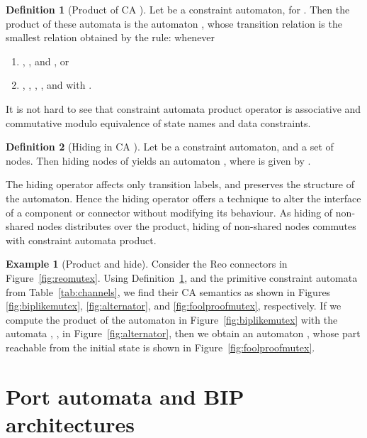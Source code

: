 \documentclass[submission,copyright,creativecommons,hidelinks]{eptcs}
\theoremstyle{plain} \newtheorem{theorem}{Theorem}
\theoremstyle{definition}
\newtheorem{definition}{Definition}
\newtheorem{example}{Example}
\theoremstyle{remark}
\newcommand\xqed[1]{\leavevmode\unskip\penalty9999 \hbox{}\nobreak\hfill
  \quad\hbox{#1}}
\newcommand\tri{\xqed{}}
\newcommand{\defn}[1]{Definition~\ref{defn:#1}}
\newcommand{\fig}[2][]{Figure~\ref{fig:#2}\ensuremath{#1}}
\newcommand{\tab}[1]{Table~\ref{tab:#1}}
\begin{document}
\begin{definition}[Product of CA \cite{BSAR06}]
\label{defn:ProductCA} 
Let  be a constraint automaton, for . Then the product  of these automata is the automaton , whose transition relation is the smallest relation obtained by the rule:  whenever
\begin{enumerate}
	\item , , and , or
	\item , , , , and  with .
\end{enumerate}
\end{definition}

It is not hard to see that constraint automata product operator is associative and commutative modulo equivalence of state names and data constraints.

\begin{definition}[Hiding in CA \cite{BSAR06}]
\label{defn:HidingCA} 
Let  be a constraint automaton, and  a set of nodes. Then hiding nodes  of  yields an automaton , where  is given by .
\end{definition}

The hiding operator affects only transition labels, and preserves the structure of the automaton. 
Hence the hiding operator offers a technique to alter the interface of a component or connector without modifying its behaviour. 
As hiding of non-shared nodes distributes over the product, hiding of non-shared nodes commutes with constraint automata product.

\begin{example}[Product and hide]
\label{ex:prodhide}
Consider the Reo connectors in \fig{reomutex}. Using \defn{ProductCA}, and the primitive constraint automata from \tab{channels}, we find their CA semantics as shown in Figures \ref{fig:biplikemutex}, \ref{fig:alternator}, and \ref{fig:foolproofmutex}, respectively. 
If we compute the product of the automaton  in \fig{biplikemutex} with the automata , , in \fig{alternator}, then we obtain an automaton , whose part reachable from the initial state  is shown in \fig{foolproofmutex}.
\tri\end{example}






\section{Port automata and BIP architectures}
\label{sec:PA2Arch}
\end{document}
